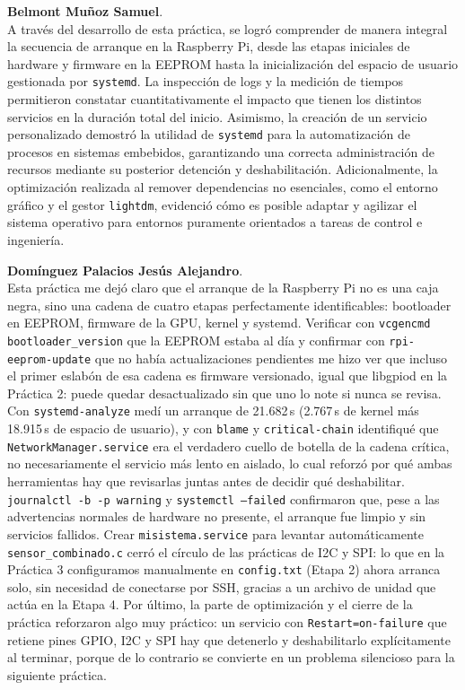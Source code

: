 \documentclass[conference]{IEEEtran}
\begin{document}
\textbf{Belmont Muñoz Samuel}. \\
A través del desarrollo de esta práctica, se logró comprender de manera integral la secuencia de arranque en la Raspberry Pi, desde las etapas iniciales de hardware y firmware en la EEPROM hasta la inicialización del espacio de usuario gestionada por \texttt{systemd}. La inspección de logs y la medición de tiempos permitieron constatar cuantitativamente el impacto que tienen los distintos servicios en la duración total del inicio. Asimismo, la creación de un servicio personalizado demostró la utilidad de \texttt{systemd} para la automatización de procesos en sistemas embebidos, garantizando una correcta administración de recursos mediante su posterior detención y deshabilitación. Adicionalmente, la optimización realizada al remover dependencias no esenciales, como el entorno gráfico y el gestor \texttt{lightdm}, evidenció cómo es posible adaptar y agilizar el sistema operativo para entornos puramente orientados a tareas de control e ingeniería.

\textbf{Domínguez Palacios Jesús Alejandro}. \\
Esta práctica me dejó claro que el arranque de la Raspberry Pi no es una caja negra, sino una cadena de cuatro etapas perfectamente identificables: bootloader en EEPROM, firmware de la GPU, kernel y systemd. Verificar con \texttt{vcgencmd bootloader\_version} que la EEPROM estaba al día y confirmar con \texttt{rpi-eeprom-update} que no había actualizaciones pendientes me hizo ver que incluso el primer eslabón de esa cadena es firmware versionado, igual que libgpiod en la Práctica 2: puede quedar desactualizado sin que uno lo note si nunca se revisa. Con \texttt{systemd-analyze} medí un arranque de 21.682\,s (2.767\,s de kernel más 18.915\,s de espacio de usuario), y con \texttt{blame} y \texttt{critical-chain} identifiqué que \texttt{NetworkManager.service} era el verdadero cuello de botella de la cadena crítica, no necesariamente el servicio más lento en aislado, lo cual reforzó por qué ambas herramientas hay que revisarlas juntas antes de decidir qué deshabilitar. \texttt{journalctl -b -p warning} y \texttt{systemctl --failed} confirmaron que, pese a las advertencias normales de hardware no presente, el arranque fue limpio y sin servicios fallidos. Crear \texttt{misistema.service} para levantar automáticamente \texttt{sensor\_combinado.c} cerró el círculo de las prácticas de I2C y SPI: lo que en la Práctica 3 configuramos manualmente en \texttt{config.txt} (Etapa 2) ahora arranca solo, sin necesidad de conectarse por SSH, gracias a un archivo de unidad que actúa en la Etapa 4. Por último, la parte de optimización y el cierre de la práctica reforzaron algo muy práctico: un servicio con \texttt{Restart=on-failure} que retiene pines GPIO, I2C y SPI hay que detenerlo y deshabilitarlo explícitamente al terminar, porque de lo contrario se convierte en un problema silencioso para la siguiente práctica.
\end{document}
